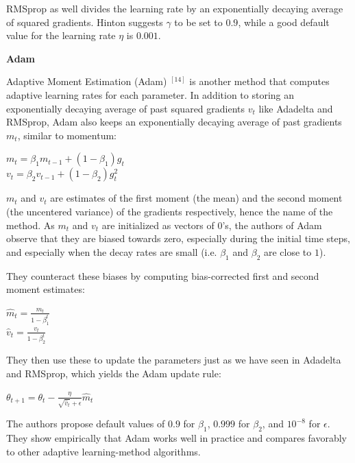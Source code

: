 \documentclass[4pt,journal,compsoc]{IEEEtran}
\begin{document}
\begin{flushleft}
    RMSprop as well divides the learning rate by an exponentially decaying average of squared gradients. Hinton suggests $\gamma$ to be set to $0.9$, while a good default value for the learning rate $\eta$ is $0.001$. \newline \newline
    
    \textbf{\Large Adam} \newline
    
    Adaptive Moment Estimation (Adam) $^ {[14]}$ is another method that computes adaptive learning rates for each parameter. In addition to storing an exponentially decaying average of past squared gradients $v_t$ like Adadelta and RMSprop, Adam also keeps an exponentially decaying average of past gradients $m_t$, similar to momentum: \newline
    
    $m_t = \beta_1 m_{t-1} + (1 - \beta_1) g_t$\\
    $v_t = \beta_2 v_{t-1} + (1 - \beta_2) g_t^2$ \newline

    $m_t$ and $v_t$ are estimates of the first moment (the mean) and the second moment (the uncentered variance) of the gradients respectively, hence the name of the method. As $m_t$ and $v_t$ are initialized as vectors of $0$'s, the authors of Adam observe that they are biased towards zero, especially during the initial time steps, and especially when the decay rates are small (i.e. $\beta_1$ and $\beta_2$ are close to $1$). \newline
    
    They counteract these biases by computing bias-corrected first and second moment estimates: \newline

    $\hat{m}_t = \frac{m_t}{1 - \beta^t_1}$\\
    $\hat{v}_t = \frac{v_t}{1 - \beta^t_2}$ \newline
    
    They then use these to update the parameters just as we have seen in Adadelta and RMSprop, which yields the Adam update rule: \newline
    
    $\theta_{t+1} = \theta_{t} - \frac{\eta}{\sqrt{\hat{v}_t} + \epsilon} \hat{m}_t$ \newline

    The authors propose default values of $0.9$ for $\beta_1$, $0.999$ for $\beta_2$, and $10^{-8}$ for $\epsilon$. They show empirically that Adam works well in practice and compares favorably to other adaptive learning-method algorithms. \newline \newline
    

\end{flushleft}
\end{document}
